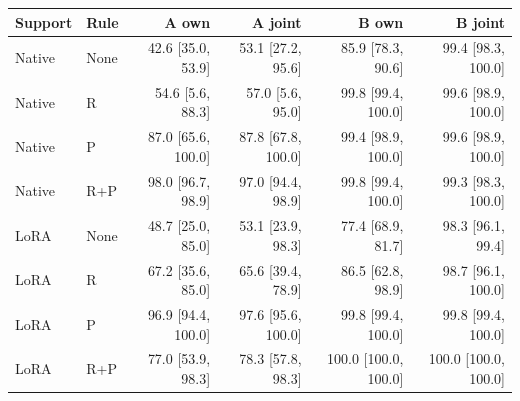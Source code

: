 \begin{tabular}{@{}llrrrr@{}}
\toprule
Support & Rule & A own & A joint & B own & B joint\\
\midrule
Native & None & 42.6 [35.0, 53.9] & 53.1 [27.2, 95.6] & 85.9 [78.3, 90.6] & 99.4 [98.3, 100.0]\\
Native & R & 54.6 [5.6, 88.3] & 57.0 [5.6, 95.0] & 99.8 [99.4, 100.0] & 99.6 [98.9, 100.0]\\
Native & P & 87.0 [65.6, 100.0] & 87.8 [67.8, 100.0] & 99.4 [98.9, 100.0] & 99.6 [98.9, 100.0]\\
Native & R+P & 98.0 [96.7, 98.9] & 97.0 [94.4, 98.9] & 99.8 [99.4, 100.0] & 99.3 [98.3, 100.0]\\
LoRA & None & 48.7 [25.0, 85.0] & 53.1 [23.9, 98.3] & 77.4 [68.9, 81.7] & 98.3 [96.1, 99.4]\\
LoRA & R & 67.2 [35.6, 85.0] & 65.6 [39.4, 78.9] & 86.5 [62.8, 98.9] & 98.7 [96.1, 100.0]\\
LoRA & P & 96.9 [94.4, 100.0] & 97.6 [95.6, 100.0] & 99.8 [99.4, 100.0] & 99.8 [99.4, 100.0]\\
LoRA & R+P & 77.0 [53.9, 98.3] & 78.3 [57.8, 98.3] & 100.0 [100.0, 100.0] & 100.0 [100.0, 100.0]\\
\bottomrule
\end{tabular}
